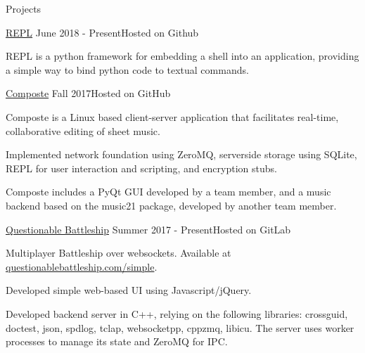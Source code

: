 \documentclass{resume} %
\begin{document}
\begin{rSection}{Projects}

\begin{rSubsection}
    {\href{https://github.com/946336/The-Worst-REPL}{REPL}}
    {June 2018 - Present}{Hosted on Github}

\item REPL is a python framework for embedding a shell into an application,
    providing a simple way to bind python code to textual commands.

\end{rSubsection}

\begin{rSubsection}
    {\href{https://composte.me}{Composte}}
    {Fall 2017}{Hosted on GitHub}

\item Composte is a Linux based client-server application that facilitates
    real-time, collaborative editing of sheet music.

\item Implemented network foundation using ZeroMQ, serverside storage using
    SQLite, REPL for user interaction and scripting, and encryption stubs.

\item Composte includes a PyQt GUI developed by a team member, and a music
    backend based on the music21 package, developed by another team member.

\end{rSubsection}

\begin{rSubsection}
    {\href{https://www.questionablebattleship.com/}{Questionable Battleship}}
    {Summer 2017 - Present}{Hosted on GitLab}

\item Multiplayer Battleship over websockets. Available at
    \href{https://questionablebattleship.com/simple}{questionablebattleship.com/simple}.

\item Developed simple web-based UI using Javascript/jQuery.

\item Developed backend server in C++, relying on the following libraries:
    crossguid, doctest, json, spdlog, tclap, websocketpp, cppzmq,
    libicu. The server uses worker processes to manage its state and ZeroMQ
    for IPC.

\end{rSubsection}



\end{rSection}
\end{document}
